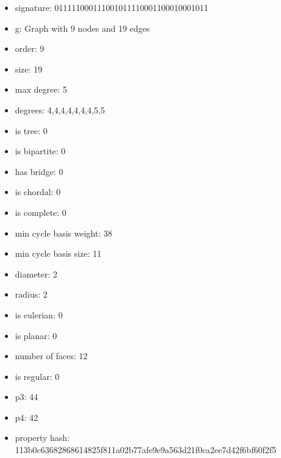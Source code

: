 \newpage
\begin{figure}
\end{figure}
\begin{itemize}
\item signature: 011111000111001011110001100010001011
\item g: Graph with 9 nodes and 19 edges
\item order: 9
\item size: 19
\item max degree: 5
\item degrees: 4,4,4,4,4,4,4,5,5
\item is tree: 0
\item is bipartite: 0
\item has bridge: 0
\item is chordal: 0
\item is complete: 0
\item min cycle basis weight: 38
\item min cycle basis size: 11
\item diameter: 2
\item radius: 2
\item is eulerian: 0
\item is planar: 0
\item number of faces: 12
\item is regular: 0
\item p3: 44
\item p4: 42
\item property hash: 113b0c63682868614825f811a02b77afe9e9a563d21f0ca2ee7d42f6bf60f2f5
\end{itemize}

